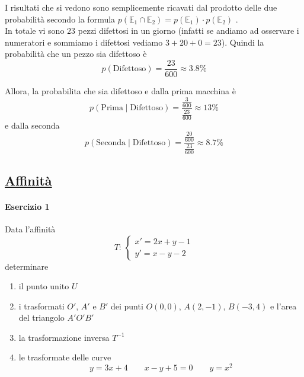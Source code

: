 I risultati che si vedono sono semplicemente ricavati dal prodotto delle due probabilità
secondo la formula $p\left(\mathbb{E}_1\cap\mathbb{E}_2\right) = p(\mathbb{E}_1)\cdot p(\mathbb{E}_2)$
.\\[\baselineskip]
In totale vi sono $23$ pezzi difettosi in un giorno (infatti se andiamo ad osservare i numeratori e 
sommiamo i difettosi vediamo $3+20+0 = 23$). Quindi la probabilità che un pezzo sia difettoso è
\begin{equation*}
p(\text{Difettoso}) = \frac{23}{600} \approx \boxed{3.8\%}
\end{equation*}

Allora, la probabilita che sia difettoso e dalla prima macchina è
\begin{equation*}
p\left(\text{Prima}\mid\text{Difettoso}\right) = \frac{\frac{3}{600}}{\frac{23}{600}} 
\approx\boxed{13\%}
\end{equation*}
e dalla seconda
\begin{equation*}
p\left(\text{Seconda}\mid\text{Difettoso}\right) = \frac{\frac{20}{600}}{\frac{23}{600}} 
\approx\boxed{8.7\%}
\end{equation*}

\subsection*{\hyperref[sec:aff]{Affinità}}\label{ex:aff}
\paragraph{Esercizio 1}
Data l'affinità
\begin{equation*}
T:\,\begin{cases}
x'=2x+y-1\\y'=x-y-2
\end{cases}
\end{equation*}
determinare
\begin{enumerate}
	\item il punto unito $U$
	\item i trasformati $O'$, $A'$ e $B'$ dei punti $O(0,0)$, $A(2,-1)$, $B(-3,4)$ e l'area del 
	triangolo $A'O'B'$
	\item la trasformazione inversa $T^{-1}$
	\item le trasformate delle curve
	\begin{equation*}
	y=3x+4\qquad x-y+5=0\qquad y=x^2
	\end{equation*}
\end{enumerate}
\divisor

